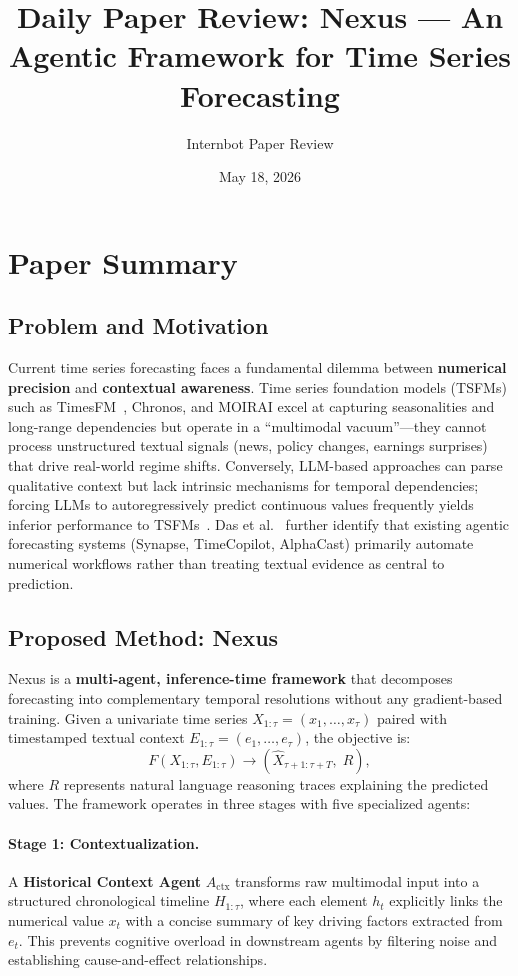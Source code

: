 \documentclass[11pt,a4paper]{article}
\title{Daily Paper Review: Nexus --- An Agentic Framework for Time Series Forecasting}
\author{Internbot Paper Review}
\date{May 18, 2026}
\begin{document}
\maketitle

\section{Paper Summary}

\subsection{Problem and Motivation}

Current time series forecasting faces a fundamental dilemma between \textbf{numerical precision} and \textbf{contextual awareness}. Time series foundation models (TSFMs) such as TimesFM~\cite{timesfm}, Chronos, and MOIRAI excel at capturing seasonalities and long-range dependencies but operate in a ``multimodal vacuum''---they cannot process unstructured textual signals (news, policy changes, earnings surprises) that drive real-world regime shifts. Conversely, LLM-based approaches can parse qualitative context but lack intrinsic mechanisms for temporal dependencies; forcing LLMs to autoregressively predict continuous values frequently yields inferior performance to TSFMs~\cite{tanetal}. Das et al.~\cite{nexus} further identify that existing agentic forecasting systems (Synapse, TimeCopilot, AlphaCast) primarily automate numerical workflows rather than treating textual evidence as central to prediction.

\subsection{Proposed Method: Nexus}

Nexus is a \textbf{multi-agent, inference-time framework} that decomposes forecasting into complementary temporal resolutions without any gradient-based training. Given a univariate time series $X_{1:\tau} = (x_1, \ldots, x_\tau)$ paired with timestamped textual context $E_{1:\tau} = (e_1, \ldots, e_\tau)$, the objective is:
\begin{equation}
F(X_{1:\tau}, E_{1:\tau}) \rightarrow (\hat{X}_{\tau+1:\tau+T},\; R),
\end{equation}
where $R$ represents natural language reasoning traces explaining the predicted values. The framework operates in three stages with five specialized agents:

\paragraph{Stage 1: Contextualization.}
A \textbf{Historical Context Agent} $A_{\mathrm{ctx}}$ transforms raw multimodal input into a structured chronological timeline $H_{1:\tau}$, where each element $h_t$ explicitly links the numerical value $x_t$ with a concise summary of key driving factors extracted from $e_t$. This prevents cognitive overload in downstream agents by filtering noise and establishing cause-and-effect relationships.
\end{document}
